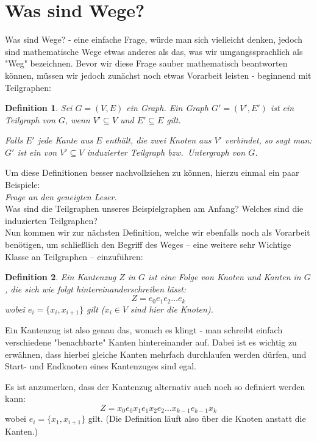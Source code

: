 \documentclass{article}
\newtheorem{definition}{Definition}
\begin{document}
\section{Was sind Wege?}
Was sind Wege? - eine einfache Frage, würde man sich vielleicht denken, jedoch sind mathematische Wege etwas anderes als das, was wir umgangssprachlich als "Weg" bezeichnen. Bevor wir diese Frage sauber mathematisch beantworten können, müssen wir jedoch zunächst noch etwas Vorarbeit leisten - beginnend mit Teilgraphen:\\
\begin{definition}
	Sei $G = (V, E)$ ein Graph. Ein Graph $G' = (V', E')$ ist ein \emph{Teilgraph} von $G$, wenn $V' \subseteq V$ und $E' \subseteq E$ gilt.
		\par\bigskip
	Falls $E'$ jede Kante aus $E$ enthält, die zwei Knoten aus $V'$ verbindet, so sagt man: $G'$ ist ein von $V' \subseteq V$ \emph{induzierter Teilgraph} bzw.\ \emph{Untergraph} von $G$.
\end{definition}
Um diese Definitionen besser nachvollziehen zu können, hierzu einmal ein paar Beispiele:\\
\bigskip
\emph{Frage an den geneigten Leser.}\\
Was sind die Teilgraphen unseres Beispielgraphen am Anfang? Welches sind die induzierten Teilgraphen?\\
\bigskip
Nun kommen wir zur nächsten Definition, welche wir ebenfalls noch als Vorarbeit benötigen, um schließlich den Begriff des Weges -- eine weitere sehr Wichtige Klasse an Teilgraphen -- einzuführen:\\
\begin{definition}
	Ein \emph{Kantenzug $Z$} in $G$ ist eine Folge von Knoten und Kanten in $G$, die sich wie folgt hintereinanderschreiben lässt:
	 \begin{equation*}
		Z = e_0e_1e_2 \ldots e_k
	\end{equation*}
	 wobei $e_i = \{x_i, x_{i+1}\}$ gilt ($x_i \in V$ sind hier die Knoten).
\end{definition}
\bigskip
Ein Kantenzug ist also genau das, wonach es klingt - man schreibt einfach verschiedene "benachbarte" Kanten hintereinander auf. Dabei ist es wichtig zu erwähnen, dass hierbei gleiche Kanten mehrfach durchlaufen werden dürfen, und Start- und Endknoten eines Kantenzuges sind egal.\\
\begin{small}
	\begin{emph}
		Es ist anzumerken, dass der Kantenzug alternativ auch noch so definiert werden kann:\\
		\begin{equation*}
			Z = x_0e_0x_1e_1x_2e_2 \ldots x_{k-1}e_{k-1}x_k
		\end{equation*}
		wobei $e_i = \{x_1, x_{i+1}\}$ gilt. (Die Definition läuft also über die Knoten anstatt die Kanten.)
	\end{emph}
\end{small}
\end{document}
